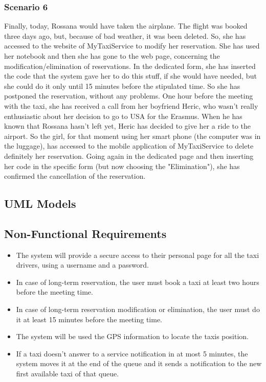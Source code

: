 		\subsubsection{Scenario 6}
		Finally, today, Rossana would have taken the airplane. The flight was booked three days ago, but, because of bad weather, it was been deleted. So, she has accessed to the website of MyTaxiService to modify her reservation. She has used her notebook and then she has gone to the web page, concerning the modification/elimination of reservations. In the dedicated form, she has inserted the code that the system gave her to do this stuff, if she would have needed, but she could do it only until 15 minutes before the stipulated time. So she has postponed the reservation, without any problems.
		One hour before the meeting with the taxi, she has received a call from her boyfriend Heric, who wasn't really enthusiastic about her decision to go to USA for the Erasmus. When he has known that Rossana hasn't left yet, Heric has decided to give her a ride to the airport. So the girl, for that moment using her smart phone (the computer was in the luggage), has accessed to the mobile application of MyTaxiService to delete definitely her reservation. Going again in the dedicated page and then inserting her code in the specific form (but now choosing the "Elimination"), she has confirmed the cancellation of the reservation. 
	\newpage
	\subsection{UML Models}
		
		\newpage
		
		\newpage
		
		
	\subsection{Non-Functional Requirements}
		\begin{itemize}
		\item The system will provide a secure access to their personal page for all the taxi drivers, using a username and a password.
		\item In case of long-term reservation, the user must book a taxi at least two hours before the meeting time.
		\item In case of long-term reservation modification or elimination, the user must do it at least 15 minutes before the meeting time.
	    \item The system will be used the GPS information to locate the taxis position.
	    \item If a taxi doesn't answer to a service notification in at most 5 minutes, the system moves it at the end of the queue and it sends a notification to the new first available taxi of that queue. 
		\end{itemize}
